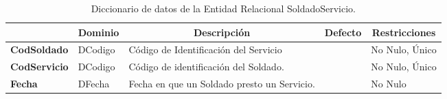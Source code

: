 \begin{table}[H]
\centering
\caption{Diccionario de datos de la Entidad Relacional SoldadoServicio.}
\label{tab-DiccR-06}
\begin{tabular}{>{\bfseries}m{4.0cm}>{}m{3.0cm}>{}m{6.0cm}>{}m{5.0cm}>{}m{2.0cm}}
\toprule
\multicolumn{1}{c}{\textbf{Atributo}} & \multicolumn{1}{c}{\textbf{Dominio}} & \multicolumn{1}{c}{\textbf{Descripción}} & \multicolumn{1}{c}{\textbf{Defecto}} & \multicolumn{1}{c}{\textbf{Restricciones}} \\ \midrule
CodSoldado    & DCodigo   & Código de Identificación del Servicio &   & No Nulo, Único\\
CodServicio & DCodigo   & Código de identificación del Soldado.  &   & No Nulo, Único\\ 
Fecha & DFecha   & Fecha en que un Soldado presto un Servicio.  &   & No Nulo\\ \bottomrule
\end{tabular}
\end{table}
